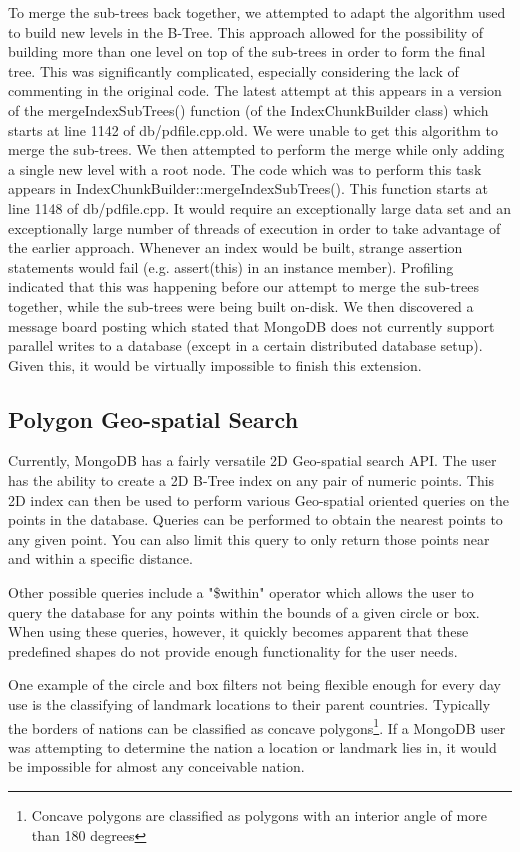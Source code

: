 \documentclass{../dependencies/acm_proc_article-sp}
\begin{document}
To merge the sub-trees back together, we attempted to adapt the algorithm used to build new levels in the B-Tree.
This approach allowed for the possibility of building more than one level on top of the sub-trees in order to form the final tree.
This was significantly complicated, especially considering the lack of commenting in the original code.
The latest attempt at this appears in a version of the mergeIndexSubTrees() function (of the IndexChunkBuilder class) which starts at line 1142 of db/pdfile.cpp.old.
We were unable to get this algorithm to merge the sub-trees.
We then attempted to perform the merge while only adding a single new level with a root node.
The code which was to perform this task appears in IndexChunkBuilder::mergeIndexSubTrees(). This function starts at line 1148 of db/pdfile.cpp.
It would require an exceptionally large data set and an exceptionally large number of threads of execution in order to take advantage of the earlier approach.
Whenever an index would be built, strange assertion statements would fail (e.g. assert(this) in an instance member).
Profiling indicated that this was happening before our attempt to merge the sub-trees together, while the sub-trees were being built on-disk.
We then discovered a message board posting which stated that MongoDB does not currently support parallel writes to a database\cite{2} (except in a certain distributed database setup\cite{3}).
Given this, it would be virtually impossible to finish this extension.

\subsection{Polygon Geo-spatial Search}
Currently, MongoDB has a fairly versatile 2D Geo-spatial search API.
The user has the ability to create a 2D B-Tree index on any pair of numeric points.
This 2D index can then be used to perform various Geo-spatial oriented queries on the 
points in the database. Queries can be performed to obtain the nearest points
to any given point. You can also limit this query to only return those points near and within a specific distance.

Other possible queries include a "\$within" operator which allows the user to query the database
for any points within the bounds of a given circle or box. When using these queries, however, it
quickly becomes apparent that these predefined shapes do not provide enough functionality for the user needs.

One example of the circle and box filters not being flexible enough for every day use is the classifying of
landmark locations to their parent countries. Typically the borders of nations can be classified as concave polygons\footnote{Concave polygons are classified as polygons with an interior angle of more than 180 degrees}.
If a MongoDB user was attempting to determine the nation a location or landmark lies in, it would be impossible for almost
any conceivable nation. 
\end{document}
